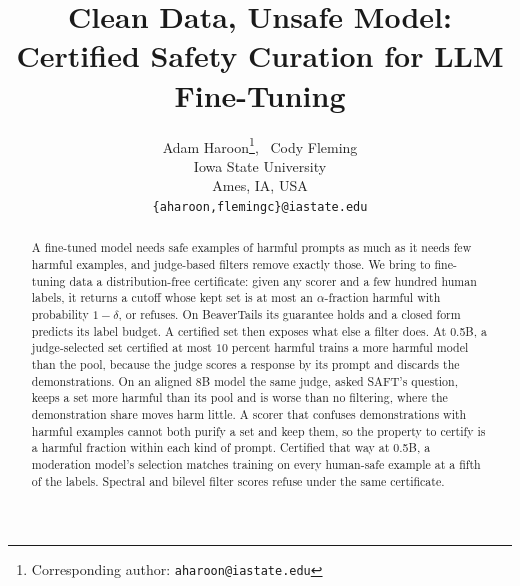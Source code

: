 \documentclass{article} %
\title{Clean Data, Unsafe Model: Certified Safety Curation for LLM Fine-Tuning}
\author{Adam Haroon\thanks{Corresponding author: \texttt{aharoon@iastate.edu}}, \ Cody Fleming \\
Iowa State University\\
Ames, IA, USA\\
\texttt{\{aharoon,flemingc\}@iastate.edu}}
\begin{document}
\maketitle

\begin{abstract}
A fine-tuned model needs safe examples of harmful prompts as much as it needs few harmful examples, and judge-based filters remove exactly those. We bring to fine-tuning data a distribution-free certificate: given any scorer and a few hundred human labels, it returns a cutoff whose kept set is at most an $\alpha$-fraction harmful with probability $1 - \delta$, or refuses. On BeaverTails its guarantee holds and a closed form predicts its label budget. A certified set then exposes what else a filter does. At 0.5B, a judge-selected set certified at most $10$ percent harmful trains a more harmful model than the pool, because the judge scores a response by its prompt and discards the demonstrations. On an aligned 8B model the same judge, asked SAFT's question, keeps a set more harmful than its pool and is worse than no filtering, where the demonstration share moves harm little. A scorer that confuses demonstrations with harmful examples cannot both purify a set and keep them, so the property to certify is a harmful fraction within each kind of prompt. Certified that way at 0.5B, a moderation model's selection matches training on every human-safe example at a fifth of the labels. Spectral and bilevel filter scores refuse under the same certificate.
\end{abstract}
\end{document}
